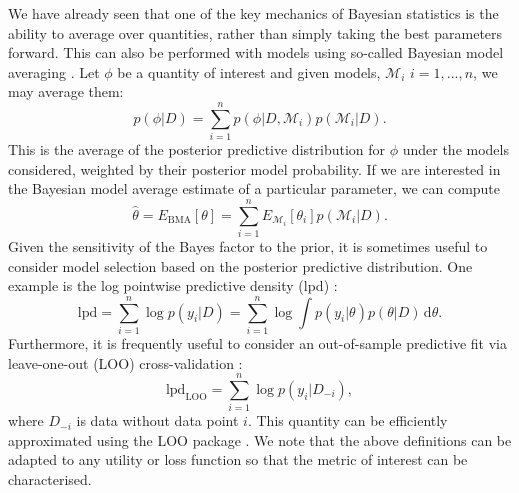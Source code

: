 \documentclass[12pt,english, journal=jpr, layout=twocolumn]{article}
\begin{document}
We have already seen that one of the key mechanics of Bayesian statistics is the ability to average over quantities, rather than simply taking the best parameters forward. This can also be performed with models using so-called Bayesian model averaging \citep{Raftery::1997}. Let $\phi$ be a quantity of interest and given models, $\mathcal{M}_i$ $i = 1,..., n$, we may average them:
\begin{equation}
p(\phi|D) = \sum_{i = 1}^{n}p(\phi|D, \mathcal{M}_i)p(\mathcal{M}_i|D).
\end{equation}
This is the average of the posterior predictive distribution for $\phi$ under the models considered, weighted by their posterior model probability. If we are interested in the Bayesian model average estimate of a particular parameter, we can compute
\begin{equation}
\hat{\theta} = E_{\text{BMA}}[\theta] = \sum_{i = 1}^{n}E_{\mathcal{M}_i}[\theta_i] p(\mathcal{M}_i|D).
\end{equation}
Given the sensitivity of the Bayes factor to the prior, it is sometimes useful to consider model selection based on the posterior predictive distribution. One example is the log pointwise predictive density (lpd) \citep{Vehtari::2017}:
\begin{equation}
\text{lpd} = \sum_{i = 1}^n \log p(y_i|D) = \sum_{i = 1}^n \log \int p(y_i|\theta)p(\theta|D)\, \text{d}\theta.
\end{equation}
Furthermore, it is frequently useful to consider an out-of-sample predictive fit via leave-one-out (LOO) cross-validation \citep{Vehtari::2017}:
\begin{equation}
\text{lpd}_\text{LOO} = \sum_{i = 1}^{n}\log p(y_i| D_{-i}),
\end{equation}
where $D_{-i}$ is data without data point $i$. This quantity can be efficiently approximated using the LOO package \citep{Vehtari::2017}. We note that the above definitions can be adapted to any utility or loss function so that the metric of interest can be characterised.
\end{document}
